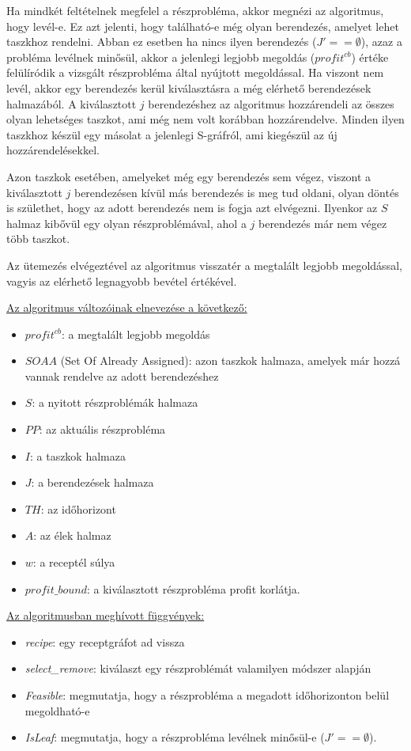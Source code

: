 Ha mindkét feltételnek megfelel a részprobléma, akkor megnézi az algoritmus, hogy levél-e. Ez azt jelenti, hogy található-e még olyan berendezés, amelyet lehet taszkhoz rendelni. Abban ez esetben ha nincs ilyen berendezés ($J'== \emptyset$), azaz a probléma levélnek minősül, akkor a jelenlegi legjobb megoldás ($profit^{cb}$) értéke felülíródik a vizsgált részprobléma által nyújtott megoldással. Ha viszont nem levél, akkor egy berendezés kerül kiválasztásra a még elérhető berendezések halmazából. A kiválasztott $j$ berendezéshez az algoritmus hozzárendeli az összes olyan lehetséges taszkot, ami még nem volt korábban hozzárendelve. Minden ilyen taszkhoz készül egy másolat a jelenlegi S-gráfról, ami kiegészül az új hozzárendelésekkel.

Azon taszkok esetében, amelyeket még egy berendezés sem végez, viszont a kiválasztott $j$ berendezésen kívül más berendezés is meg tud oldani, olyan döntés is születhet, hogy az adott berendezés nem is fogja azt elvégezni. Ilyenkor az $S$ halmaz kibővül egy olyan részproblémával, ahol a $j$ berendezés már nem végez több taszkot. 

Az ütemezés elvégeztével az algoritmus visszatér a megtalált legjobb megoldással, vagyis az elérhető legnagyobb bevétel értékével.

\newpage
\underline{Az algoritmus változóinak elnevezése a következő:}
\begin{itemize}
	\item $profit^{cb}$: a megtalált legjobb megoldás
	\item $SOAA$ (Set Of Already Assigned): azon taszkok halmaza, amelyek már hozzá vannak rendelve az adott berendezéshez
	\item $S$: a nyitott részproblémák halmaza
	\item $PP$: az aktuális részprobléma
	\item $I$: a taszkok halmaza
	\item $J$: a berendezések halmaza
	\item $TH$: az időhorizont
	\item $A$: az élek halmaz
	\item $w$: a receptél súlya
	\item $profit\_bound$: a kiválasztott részprobléma profit korlátja.
\end{itemize}

\underline{Az algoritmusban meghívott függvények:}
\begin{itemize}
	\item \textit{recipe}: egy receptgráfot ad vissza
	\item \textit{select\_remove}: kiválaszt egy részproblémát valamilyen módszer alapján
	\item \textit{Feasible}: megmutatja, hogy a részprobléma a megadott időhorizonton belül megoldható-e
	\item \textit{IsLeaf}: megmutatja, hogy a részprobléma levélnek minősül-e ($J'==\emptyset$).
\end{itemize}


